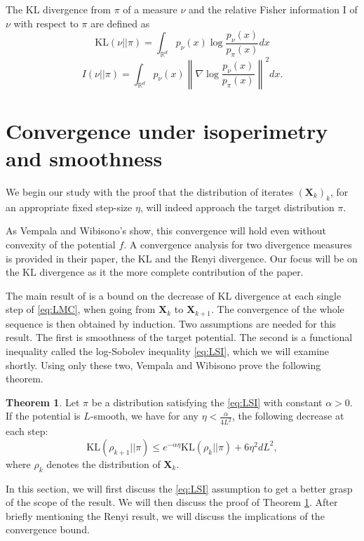 \documentclass[10pt,journal,a4paper]{IEEEtran}
\theoremstyle{definition}
\newtheorem{theorem}{Theorem}[section]
\newcommand{\R}{\mathbb{R}}
\newcommand{\bX}{\mathbf{X}}
\newcommand{\KL}{\text{KL}}
\begin{document}
The $\KL$ divergence from $\pi$ of a measure $\nu$ and the relative Fisher information I of $\nu$ with respect to $\pi$ are defined as
\[
\KL(\nu || \pi) = \int_{\R^d} p_\nu(x)\log\frac{p_\nu(x)}{p_\pi(x)}dx 
\]
\[
I(\nu || \pi) = \int_{\R^d} p_\nu(x)\left\|\nabla \log\frac{p_\nu(x)}{p_\pi(x)}\right\|^2dx.
\]

\section{Convergence under isoperimetry and smoothness}
\label{sec:vemp}
We begin our study with the proof that the distribution of iterates $(\bX_k)_k$, for an appropriate fixed step-size $\eta$, will indeed approach the target distribution $\pi$. 

As Vempala and Wibisono's show, this convergence will hold even without convexity of the potential $f$. A convergence analysis for two divergence measures is provided in their paper\cite{vempala_rapid_2019}, the $\KL$ and the Renyi divergence. Our focus will be on the $\KL$ divergence as it the more complete contribution of the paper.

The main result of \cite{vempala_rapid_2019} is a bound on the decrease of $\KL$ divergence at each single step of \eqref{eq:LMC}, when going from $\bX_k$ to $\bX_{k+1}$. The convergence of the whole sequence is then obtained by induction. Two assumptions are needed for this result. The first is smoothness of the target potential. The second is a functional inequality called the log-Sobolev inequality \eqref{eq:LSI}, which we will examine shortly. Using only these two, Vempala and Wibisono prove the following theorem. 

\begin{boxF}
\begin{theorem}
Let $\pi$ be a distribution satisfying the \eqref{eq:LSI} with constant $\alpha > 0$. If the potential is $L$-smooth, we have for any $\eta < \frac{\alpha}{4L^2}$, the following decrease at each step:
\[
\KL(\rho_{k+1} || \pi) \leq e^{-\alpha \eta}\KL(\rho_{k} || \pi) + 6\eta^2 d L^2,
\]
where $\rho_k$ denotes the distribution of $\bX_k$.
\label{thm:step}
\end{theorem}
\end{boxF}
In this section, we will first discuss the \eqref{eq:LSI} assumption to get a better grasp of the scope of the result. We will then discuss the proof of Theorem \ref{thm:step}. After briefly mentioning the Renyi result, we will discuss the implications of the convergence bound.
\end{document}

